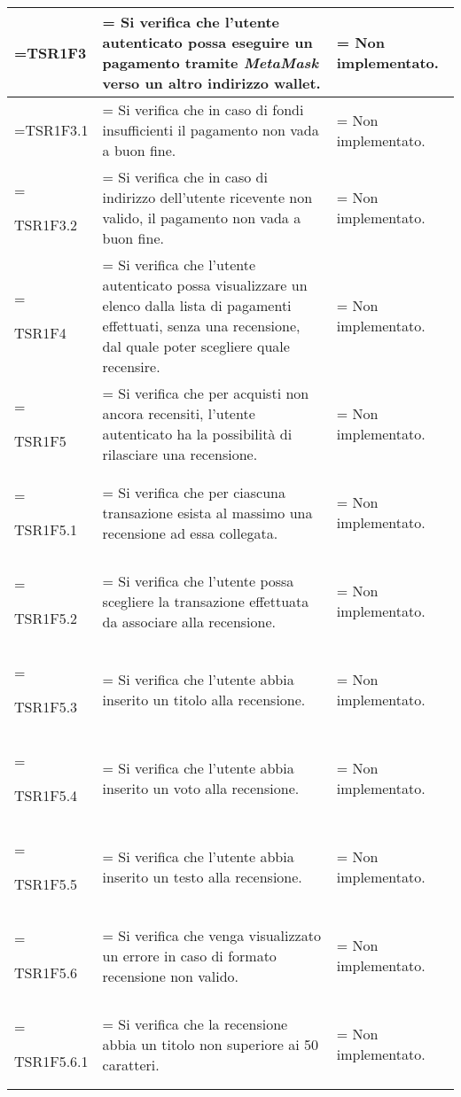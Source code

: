\begin{xltabular}{\textwidth} {
        >{\hsize\linewidth=\hsize}X
        >{\hsize\linewidth=\hsize}X
        >{\hsize\linewidth=\hsize}X
    }
    TSR1F3&
    Si verifica che l'utente autenticato possa eseguire un pagamento tramite \textit{MetaMask} verso un altro indirizzo wallet. &
    Non implementato.
    \\ \hline
    
    TSR1F3.1&
    Si verifica che in caso di fondi insufficienti il pagamento non vada a buon fine.&
    Non implementato.
    \\ \hline
    
    TSR1F3.2&
    Si verifica che in caso di indirizzo dell'utente ricevente non valido, il pagamento non vada a buon fine.&
    Non implementato.
    \\ \hline
    
    TSR1F4&
    Si verifica che l'utente autenticato possa visualizzare un elenco dalla lista di pagamenti effettuati, senza una recensione, dal quale poter scegliere quale recensire.&
    Non implementato.
    \\ \hline

    TSR1F5&
    Si verifica che per acquisti non ancora recensiti, l'utente autenticato ha la possibilità di rilasciare una recensione.&
    Non implementato.
    \\ \hline

    TSR1F5.1&
    Si verifica che per ciascuna transazione esista al massimo una recensione ad essa collegata.&
    Non implementato.
    \\ \hline
    
    TSR1F5.2&
    Si verifica che l'utente possa scegliere la transazione effettuata da associare alla recensione.&
    Non implementato.
    \\ \hline

    TSR1F5.3&
    Si verifica che l'utente abbia inserito un titolo alla recensione.&
    Non implementato.
    \\ \hline

    TSR1F5.4&
    Si verifica che l'utente abbia inserito un voto alla recensione.&
    Non implementato.
    \\ \hline

    TSR1F5.5&
    Si verifica che l'utente abbia inserito un testo alla recensione.&
    Non implementato.
    \\ \hline

    TSR1F5.6&
    Si verifica che venga visualizzato un errore in caso di formato recensione non valido.&
    Non implementato.
    \\ \hline
    
    TSR1F5.6.1&
    Si verifica che la recensione abbia un titolo non superiore ai 50 caratteri.&
    Non implementato.
    \\ \hline


\end{xltabular}
